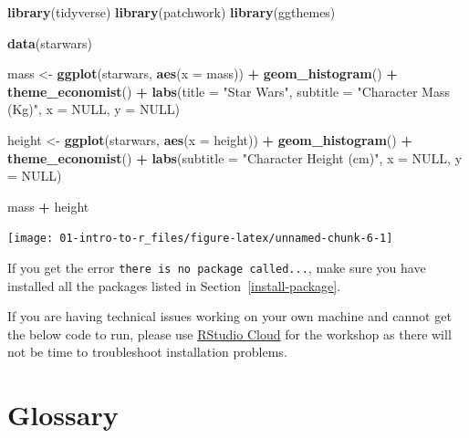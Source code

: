 \documentclass[
  oneside]{book}
\newenvironment{Shaded}{\begin{snugshade}}{\end{snugshade}}
\newcommand{\AttributeTok}[1]{\textcolor[rgb]{0.13,0.29,0.53}{#1}}
\newcommand{\ConstantTok}[1]{\textcolor[rgb]{0.56,0.35,0.01}{#1}}
\newcommand{\FunctionTok}[1]{\textcolor[rgb]{0.13,0.29,0.53}{\textbf{#1}}}
\newcommand{\NormalTok}[1]{#1}
\newcommand{\OtherTok}[1]{\textcolor[rgb]{0.56,0.35,0.01}{#1}}
\newcommand{\SpecialCharTok}[1]{\textcolor[rgb]{0.81,0.36,0.00}{\textbf{#1}}}
\newcommand{\StringTok}[1]{\textcolor[rgb]{0.31,0.60,0.02}{#1}}
\begin{document}
\begin{Shaded}
\begin{Highlighting}[]
\FunctionTok{library}\NormalTok{(tidyverse)}
\FunctionTok{library}\NormalTok{(patchwork)}
\FunctionTok{library}\NormalTok{(ggthemes)}

\FunctionTok{data}\NormalTok{(starwars)}

\NormalTok{mass }\OtherTok{\textless{}{-}} \FunctionTok{ggplot}\NormalTok{(starwars, }\FunctionTok{aes}\NormalTok{(}\AttributeTok{x =}\NormalTok{ mass)) }\SpecialCharTok{+}
  \FunctionTok{geom\_histogram}\NormalTok{() }\SpecialCharTok{+}
  \FunctionTok{theme\_economist}\NormalTok{() }\SpecialCharTok{+}
  \FunctionTok{labs}\NormalTok{(}\AttributeTok{title =} \StringTok{"Star Wars"}\NormalTok{, }
       \AttributeTok{subtitle =} \StringTok{"Character Mass (Kg)"}\NormalTok{,}
       \AttributeTok{x =} \ConstantTok{NULL}\NormalTok{, }\AttributeTok{y =} \ConstantTok{NULL}\NormalTok{)}

\NormalTok{height }\OtherTok{\textless{}{-}} \FunctionTok{ggplot}\NormalTok{(starwars, }\FunctionTok{aes}\NormalTok{(}\AttributeTok{x =}\NormalTok{ height)) }\SpecialCharTok{+}
  \FunctionTok{geom\_histogram}\NormalTok{() }\SpecialCharTok{+}
  \FunctionTok{theme\_economist}\NormalTok{() }\SpecialCharTok{+}
  \FunctionTok{labs}\NormalTok{(}\AttributeTok{subtitle =} \StringTok{"Character Height (cm)"}\NormalTok{,}
       \AttributeTok{x =} \ConstantTok{NULL}\NormalTok{, }\AttributeTok{y =} \ConstantTok{NULL}\NormalTok{)}

\NormalTok{mass }\SpecialCharTok{+}\NormalTok{ height}
\end{Highlighting}
\end{Shaded}

\begin{center}\texttt{[image: 01-intro-to-r\_files/figure-latex/unnamed-chunk-6-1]} \end{center}

If you get the error \texttt{there\ is\ no\ package\ called...}, make sure you have installed all the packages listed in Section~\ref{install-package}.

If you are having technical issues working on your own machine and cannot get the below code to run, please use \href{https://rstudio.cloud/}{RStudio Cloud} for the workshop as there will not be time to troubleshoot installation problems.

\section{Glossary}\label{glossary-intro}
\end{document}
